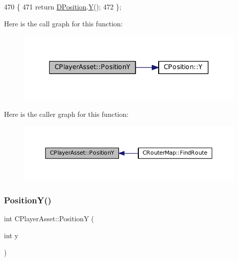 \begin{DoxyCode}
470                              \{
471             \textcolor{keywordflow}{return} \hyperlink{classCPlayerAsset_aa9f53c009b181c7c5647c6b03776a04c}{DPosition}.\hyperlink{classCPosition_a1aa8a30e2f08dda1f797736ba8c13a87}{Y}();  
472         \};
\end{DoxyCode}
Here is the call graph for this function\+:\nopagebreak
\begin{figure}[H]
\begin{center}
\leavevmode
\includegraphics[width=327pt]{classCPlayerAsset_a4f70846298e9951489ef138847c268a5_cgraph}
\end{center}
\end{figure}
Here is the caller graph for this function\+:\nopagebreak
\begin{figure}[H]
\begin{center}
\leavevmode
\includegraphics[width=350pt]{classCPlayerAsset_a4f70846298e9951489ef138847c268a5_icgraph}
\end{center}
\end{figure}
\hypertarget{classCPlayerAsset_a497fe719ca97252f0ee7985e0e30518e}{}\label{classCPlayerAsset_a497fe719ca97252f0ee7985e0e30518e} 
\subsubsection{\texorpdfstring{Position\+Y()}{PositionY()}\hspace{0.1cm}{\footnotesize\ttfamily [2/2]}}
{\footnotesize\ttfamily int C\+Player\+Asset\+::\+PositionY (\begin{DoxyParamCaption}\item[{int}]{y }\end{DoxyParamCaption})}



